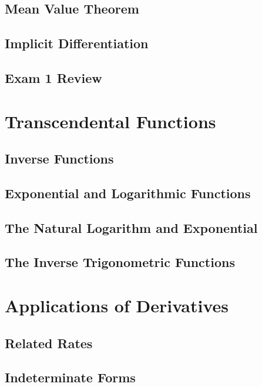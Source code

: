 \documentclass[12pt]{memoir}
\begin{document}
    \section{Mean Value Theorem}
    
    \section{Implicit Differentiation}
    
    \section{Exam 1 Review}
    

\chapter{Transcendental Functions}
    \section{Inverse Functions}
    
    \section{Exponential and Logarithmic Functions}
    
    \section{The Natural Logarithm and Exponential}
    
    \section{The Inverse Trigonometric Functions}
    

\chapter{Applications of Derivatives}
    \section{Related Rates}
    
    \section{Indeterminate Forms}
    
\end{document}
